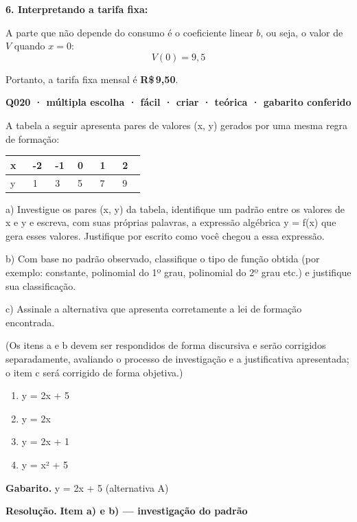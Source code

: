 \documentclass[11pt,a4paper]{article}
\begin{document}
\textbf{6. Interpretando a tarifa fixa:}

A parte que não depende do consumo é o coeficiente linear $b$, ou seja, o valor de $V$ quando $x=0$:
$$V(0) = 9{,}5$$

Portanto, a tarifa fixa mensal é \textbf{R\$\,9,50}.

\bigskip\noindent\textbf{Q020 · múltipla escolha · fácil · criar · teórica · gabarito conferido}\par\nopagebreak
A tabela a seguir apresenta pares de valores (x, y) gerados por uma mesma regra de formação:

\begin{center}
\begin{tabular}{|p{0.143\linewidth}|p{0.143\linewidth}|p{0.143\linewidth}|p{0.143\linewidth}|p{0.143\linewidth}|p{0.143\linewidth}|}
\hline
\textbf{x} & \textbf{-2} & \textbf{-1} & \textbf{0} & \textbf{1} & \textbf{2} \\
\hline
y & 1 & 3 & 5 & 7 & 9 \\
\hline
\end{tabular}
\end{center}

a) Investigue os pares (x, y) da tabela, identifique um padrão entre os valores de x e y e escreva, com suas próprias palavras, a expressão algébrica y = f(x) que gera esses valores. Justifique por escrito como você chegou a essa expressão.

b) Com base no padrão observado, classifique o tipo de função obtida (por exemplo: constante, polinomial do 1º grau, polinomial do 2º grau etc.) e justifique sua classificação.

c) Assinale a alternativa que apresenta corretamente a lei de formação encontrada.

(Os itens a e b devem ser respondidos de forma discursiva e serão corrigidos separadamente, avaliando o processo de investigação e a justificativa apresentada; o item c será corrigido de forma objetiva.)
\begin{enumerate}[label=(\alph*)]
\item y = 2x + 5
\item y = 2x
\item y = 2x + 1
\item y = x² + 5
\end{enumerate}

\textbf{Gabarito.} y = 2x + 5 (alternativa A)

\textbf{Resolução.} \textbf{Item a) e b) — investigação do padrão}
\end{document}
